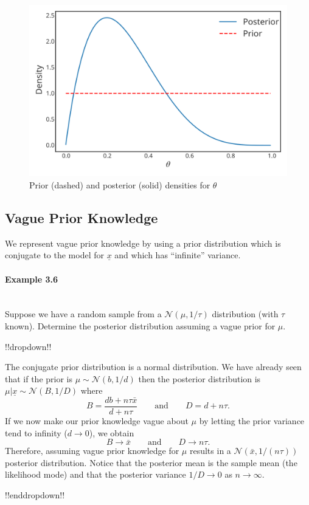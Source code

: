 \begin{figure}[ht]

\includegraphics{images/priorplot1.svg}
\caption{Prior (dashed) and posterior (solid) densities for $\theta$}


\end{figure}

 
\subsection*{Vague Prior Knowledge}
We represent vague prior knowledge by using a prior distribution which is conjugate to the model for $\underline{x}$ and which has ``infinite'' variance.

\paragraph{Example 3.6}{~\\
Suppose we have a random sample from a $\mathcal{N}(\mu,1/\tau)$ distribution (with $\tau$ known). Determine the posterior distribution assuming a vague prior for $\mu$.

!!dropdown!!

The conjugate prior distribution is a normal distribution. We have already seen that if the prior is $\mu\sim \mathcal{N}(b,1/d)$ then the posterior distribution is $\mu|\underline{x}\sim \mathcal{N}(B,1/D)$ where
            \begin{equation*}
                B=\frac{db+n\tau\bar x}{d+n\tau}\qquad\text{and}\qquad
                D=d+n\tau.
            \end{equation*}
        If we now make our prior knowledge vague about $\mu$ by letting the prior variance tend to infinity ($d\to 0$), we obtain
        $$
        B\to\bar x\qquad\text{and}\qquad D\to n\tau.
        $$
        Therefore, assuming vague prior knowledge for $\mu$ results in a $\mathcal{N}(\bar x,1/(n\tau))$ posterior distribution.  Notice that the posterior mean is the sample mean (the likelihood mode) and that the posterior variance $1/D\to 0$ as $n\to\infty$.

!!enddropdown!!}



